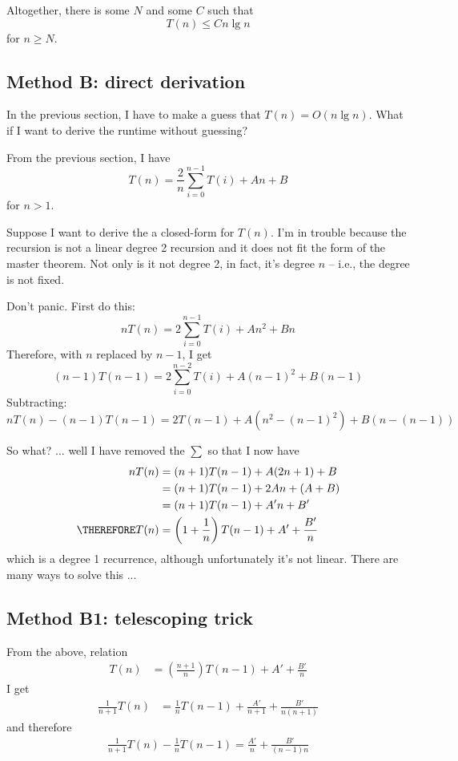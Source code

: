 Altogether, there is some $N$ and some $C$
such that
\[
  T(n) \leq C n \lg n
\]
for $n \geq N$.

\subsection{Method B: direct derivation}

In the previous section, I have to make a
guess
that $T(n) = O(n \lg n)$.
What if I want to derive the runtime without
guessing?

From the previous section, I have
\[
  T(n) = \frac{2}{n} \sum_{i = 0}^{n - 1} T(i) + An + B
\]
for $n > 1$.

Suppose I want to derive the
a closed-form for $T(n)$.
I'm in trouble because the recursion
is not a linear degree 2 recursion and it does not
fit the form of the master theorem.
Not only is it not degree 2, in fact, it's degree $n$ --
i.e., the degree is not fixed.

Don't panic. First do this:
\[
  nT(n) = 2\sum_{i = 0}^{n - 1} T(i) + An^2 + Bn
\]
Therefore, with $n$ replaced by $n - 1$, I get
\[
  (n-1)T(n-1) = 2\sum_{i = 0}^{n-2} T(i) + A(n-1)^2 + B(n-1)
\]
Subtracting:
\[
  nT(n) - (n-1)T(n-1)= 2T(n-1) + A(n^2 - (n - 1)^2) + B(n - (n - 1))
\]

So what? ... 
well I have removed the $\sum$ so that I now have
\begin{align*}
  nT(n)
  &= (n + 1)T(n - 1) + A(2n + 1) + B \\
  &= (n + 1)T(n - 1) + 2An + (A + B) \\
  &= (n + 1)T(n - 1) + A'n + B' \\
    \THEREFORE
  T(n)
  &= \left( 1 + \frac{1}{n} \right) T(n - 1) + A' + \frac{B'}{n}
\end{align*}
which is a degree 1 recurrence, although unfortunately it's not
linear.
There are many ways to solve this ...

\subsection{Method B1: telescoping trick}

From the above, relation
\begin{align*}
  T(n)
  &= \left( \frac{n + 1}{n} \right) T(n - 1) + A' + \frac{B'}{n}
\end{align*}
I get
\begin{align*}
  \frac{1}{n + 1}T(n)
  &= \frac{1}{n}  T(n - 1) + \frac{A'}{n+1} + \frac{B'}{n(n + 1)}
\end{align*}
and therefore
\begin{align*}
  \frac{1}{n + 1} T(n) - \frac{1}{n}  T(n - 1) = \frac{A'}{n} + \frac{B'}{(n-1)n}
\end{align*}

